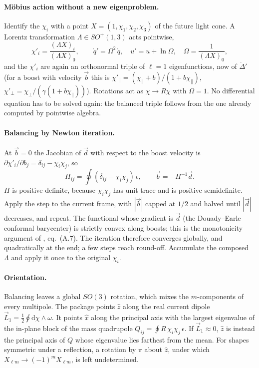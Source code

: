 \documentclass[11pt]{article}
\newcommand{\dd}{\mathrm{d}}
\newcommand{\qo}{\mathring{q}}          %
\newcommand{\Lapo}{\mathring{\Delta}}   %
\begin{document}
\paragraph{M\"obius action without a new eigenproblem.}
Identify the $\chi_i$ with a point $X = (1, \chi_1, \chi_2, \chi_3)$ of the
future light cone.  A Lorentz transformation $\Lambda\in SO^+(1,3)$ acts
pointwise,
\begin{equation*}
  \chi'_i = \frac{(\Lambda X)_i}{(\Lambda X)_0},
  \qquad
  \qo' = \Omega^2\,\qo,\quad
  u' = u + \ln\Omega,\quad
  \Omega = \frac{1}{(\Lambda X)_0} ,
\end{equation*}
and the $\chi'_i$ are again an orthonormal triple of $\ell=1$
eigenfunctions, now of $\Lapo'$ (for a boost with velocity $\vec b$ this is
$\chi'_\parallel = (\chi_\parallel+b)/(1+b\chi_\parallel)$,
$\chi'_\perp = \chi_\perp/(\gamma(1+b\chi_\parallel))$).  Rotations act as
$\chi\to R\chi$ with $\Omega=1$.  No differential equation has to be solved
again: the balanced triple follows from the one already computed by pointwise
algebra.

\paragraph{Balancing by Newton iteration.}
At $\vec b = 0$ the Jacobian of $\vec d$ with respect to the boost velocity is
$\partial\chi'_i/\partial b_j = \delta_{ij} - \chi_i\chi_j$, so
\begin{equation*}
  H_{ij} = \oint (\delta_{ij} - \chi_i\chi_j)\,\epsilon ,
  \qquad
  \vec b = -H^{-1}\vec d .
\end{equation*}
$H$ is positive definite, because $\chi_i\chi_j$ has unit trace and is
positive semidefinite.  Apply the step to the current frame, with $|\vec b|$
capped at $1/2$ and halved until $|\vec d|$ decreases, and repeat.  The
functional whose gradient is $\vec d$ (the Douady--Earle conformal barycenter)
is strictly convex along boosts; this is the monotonicity argument of
\cite{akkl2022}, eq.~(A.7).  The iteration therefore converges globally, and
quadratically at the end; a few steps reach round-off.  Accumulate the
composed $\Lambda$ and apply it once to the original $\chi_i$.

\paragraph{Orientation.}
Balancing leaves a global $SO(3)$ rotation, which mixes the $m$-components
of every multipole.  The package points $\hat z$ along the real current
dipole $\vec L_1 = \tfrac12\oint \dd\chi\wedge\omega$.  It points $\hat x$
along the principal axis with the largest eigenvalue of the in-plane block
of the mass quadrupole $Q_{ij} = \oint R\,\chi_i\chi_j\,\epsilon$.  If
$\vec L_1\approx 0$, $\hat z$ is instead the principal axis of $Q$ whose
eigenvalue lies farthest from the mean.  For shapes symmetric under a
reflection, a rotation by $\pi$ about $\hat z$, under which
$X_{\ell m}\to(-1)^m X_{\ell m}$, is left undetermined.
\end{document}
